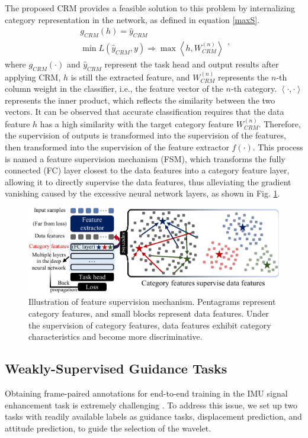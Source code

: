 \documentclass[letterpaper]{article}
\begin{document}
The proposed CRM provides a feasible solution to this problem by internalizing category representation in the network, as defined in equation \ref{maxS}.
\begin{equation}
\label{maxS}
\begin{array}{l}
{g_{CRM}}(h) = {{\hat y}_{CRM}}\\
\min L({{\hat y}_{CRM}},y) \Rightarrow \max \left\langle {h,W_{CRM}^{(n)}} \right\rangle
\end{array},
\end{equation}
where $g_{CRM}(\cdot)$ and ${\hat y}_{CRM}$ represent the task head and output results after applying CRM, $h$ is still the extracted feature, and $W_{CRM}^{(n)}$ represents the $n$-th column weight in the classifier, i.e., the feature vector of the $n$-th category. $\left\langle { \cdot , \cdot } \right\rangle $ represents the inner product, which reflects the similarity between the two vectors. It can be observed that accurate classification requires that the data feature $h$ has a high similarity with the target category feature $W_{CRM}^{(n)}$. Therefore, the supervision of outputs is transformed into the supervision of the features, then transformed into the supervision of the feature extractor $f(\cdot)$. This process is named a feature supervision mechanism (FSM), which transforms the fully connected (FC) layer closest to the data features into a category feature layer, allowing it to directly supervise the data features, thus alleviating the gradient vanishing caused by the excessive neural network layers, as shown in Fig. \ref{FSM Illustration}.
\begin{figure}[!h]
\centering
\includegraphics[width=\linewidth]{Figure2.pdf}
\caption{Illustration of feature supervision mechanism. Pentagrams represent category features, and small blocks represent data features. Under the supervision of category features, data features exhibit category characteristics and become more discriminative.}
\label{FSM Illustration}
\end{figure}


\subsection{Weakly-Supervised Guidance Tasks}
Obtaining frame-paired annotations for end-to-end training in the IMU signal enhancement task is extremely challenging \cite{marchetti2020multiple}. To address this issue, we set up two tasks with readily available labels as guidance tasks, displacement prediction, and attitude prediction, to guide the selection of the wavelet.
\end{document}

